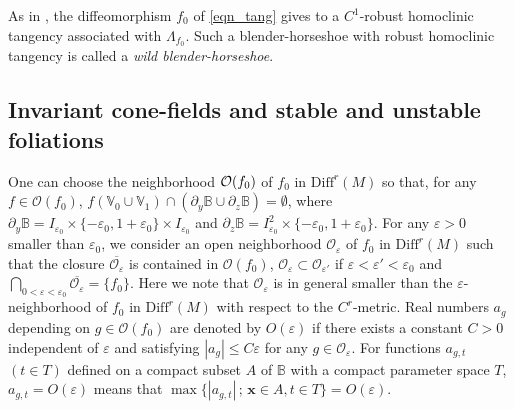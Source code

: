 \documentclass{amsart}
\theoremstyle{definition}
\numberwithin{equation}{section}
\numberwithin{figure}{section}
\begin{document}
As in \cite{KNS23}, the diffeomorphism $f_{0}$ of \eqref{eqn_tang}  
gives to a $C^{1}$-robust homoclinic tangency associated with $\Lambda_{f_0}$. 
Such a blender-horseshoe with robust homoclinic tangency 
is called a \emph{wild blender-horseshoe}.




\subsection{Invariant cone-fields and stable and unstable foliations}\label{ss_cone_foliation}
One can choose the neighborhood $\index{Of0@$\mathcal{O}(f_0)$}\mathcal{O}(f_0)$ of $f_0$ in $\mathrm{Diff}^r(M)$ so that, for any $f\in \mathcal{O}(f_0)$, 
$f(\mathbb{V}_0\cup \mathbb{V}_1)\cap (\partial_y\mathbb{B}\cup \partial_z\mathbb{B})=\emptyset$, 
where $\partial_y\mathbb{B}=I_{\varepsilon_0}\times \{-\varepsilon_0,1+\varepsilon_0\}\times I_{\varepsilon_0}$ and 
$\partial_z\mathbb{B}=I_{\varepsilon_0}^2\times \{-\varepsilon_0,1+\varepsilon_0\}$.
For any $\varepsilon>0$ smaller than $\varepsilon_0$, we consider an open neighborhood $\mathcal{O}_{\varepsilon}$ of $f_0$ in $\mathrm{Diff}^r(M)$ 
such that the closure  $\overline{\mathcal{O}_{\varepsilon}}$ is contained in $\mathcal{O}(f_0)$, 
$\mathcal{O}_{\varepsilon}\subset \mathcal{O}_{\varepsilon'}$ if $\varepsilon<\varepsilon'<\varepsilon_0$ and $\bigcap_{0<\varepsilon<\varepsilon_0}\overline{\mathcal{O}_\varepsilon}=\{f_0\}$.
Here we note that $\mathcal{O}_{\varepsilon}$ is in general smaller than the $\varepsilon$-neighborhood of 
$f_0$ in $\mathrm{Diff}^r(M)$ with respect to the $C^r$-metric.
Real numbers $a_g$ depending on $g\in \mathcal{O}(f_0)$ are denoted by $O(\varepsilon)$ if there exists a constant $C>0$ independent of $\varepsilon$ 
and satisfying $|a_g|\leq C\varepsilon$ for any $g\in \mathcal{O}_{\varepsilon}$.
For functions  $a_{g,t}$ $(t\in T)$ defined on a compact subset $A$ of $\mathbb{B}$ with a compact parameter space $T$, 
$a_{g,t}=O(\varepsilon)$ means that $\max\{|a_{g,t}|\,;\, \boldsymbol{x}\in A,t\in T\}=O(\varepsilon)$.
\end{document}
